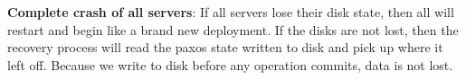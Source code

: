 \documentclass[letterpaper,10pt]{article}
\begin{document}
\textbf{Complete crash of all servers}: If all servers lose their disk
state, then all will restart and begin like a brand new deployment. If
the disks are not lost, then the recovery process will read the paxos
state written to disk and pick up where it left off. Because we write
to disk before any operation commits, data is not lost.



\end{document}
